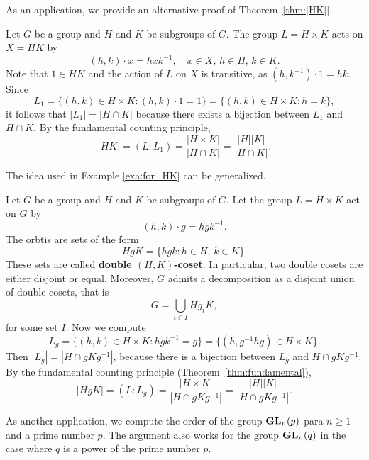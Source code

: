 As an application, we provide an alternative proof
of Theorem~\ref{thm:|HK|}. 

\begin{example}
\label{exa:for_HK}
Let $G$ be a group and $H$ and $K$ be subgroups of $G$. 
The group $L=H\times K$ acts on $X=HK$ by 
\[
(h,k)\cdot x=hxk^{-1},\quad x\in X,\,h\in H,\,k\in K.
\]
Note that $1\in HK$ and the action of $L$ on $X$ is transitive, as 
$(h,k^{-1})\cdot 1 = hk$. Since 
\[
L_1=\{(h,k)\in H\times K: (h,k)\cdot 1=1\}=\{(h,k)\in H\times K:h=k\},
\]
it follows that $|L_1|=|H\cap K|$ because there exists a bijection
between $L_1$ and 
$H\cap K$. By the fundamental counting principle, 
\[
|HK|=(L:L_1)=\frac{|H\times K|}{|H\cap K|}=\frac{|H||K|}{|H\cap K|}.
\]
\end{example}

The idea used in Example \ref{exa:for_HK} can be generalized. 

\begin{example}
Let $G$ be a group and $H$ and $K$ be subgroups of $G$. Let the group $L=H\times K$ act on $G$ by
\[
(h,k)\cdot g=hgk^{-1}.
\]
The orbtis are sets of the form 
\[
HgK=\{hgk:h\in H,\,k\in K\}.
\]
These sets are called \textbf{double $(H,K)$-coset}. 
In particular, two double cosets are either disjoint 
or equal. Moreover, $G$ admits a decomposition 
as a disjoint union of double cosets, that is 
\[
G=\bigcup_{i\in I}Hg_iK,
\]
for some set $I$. Now we compute 
\[
L_g=\{(h,k)\in H\times K:hgk^{-1}=g\}=\{(h,g^{-1}hg)\in H\times K\}.
\]
Then $|L_g|=|H\cap gKg^{-1}|$, because there is a bijection between $L_g$ and
$H\cap gKg^{-1}$. By the fundamental counting principle (Theorem~\ref{thm:fundamental}), 
\[
|HgK|=(L:L_g)=\frac{|H\times K|}{|H\cap gKg^{-1}|}=\frac{|H||K|}{|H\cap gKg^{-1}|}.
\]
\end{example}

As another application, we compute the
order of the group $\mathbf{GL}_n(p)$ para $n\geq1$ and 
a prime number $p$. 
The argument also works for
the group $\mathbf{GL}_n(q)$ in the case where
$q$ is a power of the prime number $p$.

